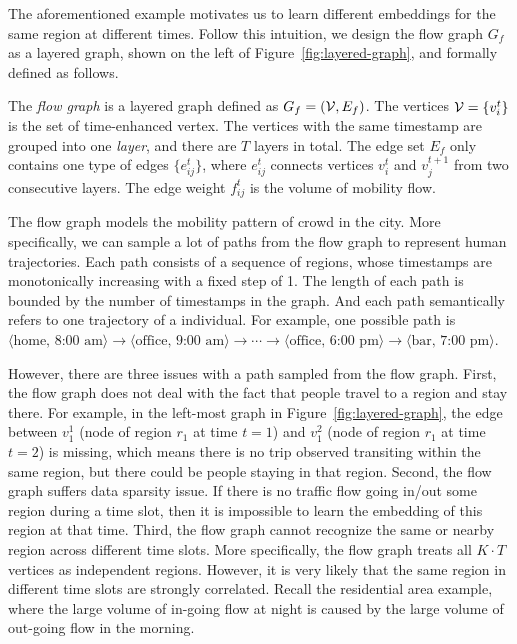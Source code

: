 The aforementioned example motivates us to learn different embeddings for the same region at different times. Follow this intuition, we design the flow graph $G_f$ as a layered graph, shown on the left of Figure~\ref{fig:layered-graph}, and formally defined as follows.


\begin{definition}
The \emph{flow graph} is a layered graph defined as $G_f = (\mathcal{V}, E_f)$. The vertices $\mathcal{V} = \{ v_i^t \}$ is the set of time-enhanced vertex. The vertices with the same timestamp are grouped into one \emph{layer}, and there are $T$ layers in total.  The edge set $E_f$ only contains one type of edges $\{ e_{ij}^t \}$, where $e_{ij}^t$ connects vertices $v_i^t$ and $v_j^{t+1}$ from two consecutive layers. The edge weight $f_{ij}^t$ is the volume of mobility flow.
\end{definition}


The flow graph models the mobility pattern of crowd in the city. More specifically, we can sample a lot of paths from the flow graph to represent human trajectories. Each path consists of a sequence of regions, whose timestamps are monotonically increasing with a fixed step of 1. The length of each path is bounded by the number of timestamps in the graph. And each path semantically refers to one trajectory of a individual. For example, one possible path is $\langle \text{home, 8:00 am} \rangle \rightarrow \langle \text{office, 9:00 am} \rangle \rightarrow \cdots \rightarrow \langle \text{office, 6:00 pm} \rangle \rightarrow \langle \text{bar, 7:00 pm} \rangle $.


However, there are three issues with a path sampled from the flow graph. First, the flow graph does not deal with the fact that people travel to a region and stay there. For example, in the left-most graph in Figure~\ref{fig:layered-graph}, the edge between $v_1^1$ (node of region $r_1$ at time $t=1$) and $v_1^2$ (node of region $r_1$ at time $t=2$) is missing, which means there is no trip observed transiting within the same region, but there could be people staying in that region. Second, the flow graph suffers data sparsity issue. If there is no traffic flow going in/out some region during a time slot, then it is impossible to learn the embedding of this region at that time. Third, the flow graph cannot recognize the same or nearby region across different time slots. More specifically, the flow graph treats all $K \cdot T$ vertices as independent regions. However, it is very likely that the same region in different time slots are strongly correlated. Recall the residential area example, where the large volume of in-going flow at night is caused by the large volume of out-going flow in the morning.







